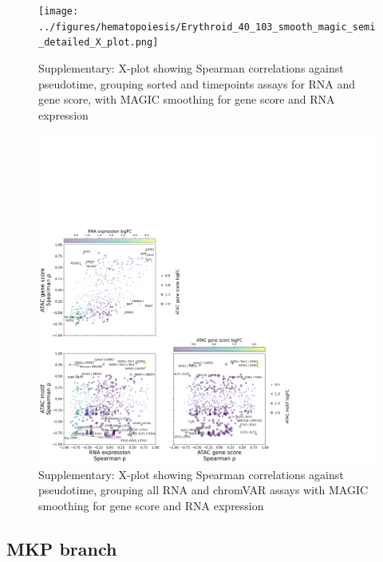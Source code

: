 \documentclass[a4paper]{article}
\begin{document}
\begin{figure}[!htb]
  \centering
  \texttt{[image: ../figures/hematopoiesis/Erythroid\_40\_103\_smooth\_magic\_semi\_detailed\_X\_plot.png]}
  \caption{Supplementary: X-plot showing Spearman correlations against pseudotime, grouping sorted and timepoints assays for RNA and gene score, with MAGIC smoothing for gene score and RNA expression}
\end{figure}

\begin{figure}[!htb]
  \centering
  \includegraphics[width=\textwidth]{../figures/hematopoiesis/Erythroid_40_103_smooth_magic_grouped_X_plot.png}
  \caption{Supplementary: X-plot showing Spearman correlations against pseudotime, grouping all RNA and chromVAR assays with MAGIC smoothing for gene score and RNA expression}
\end{figure}


\subsection{MKP branch}
\end{document}
